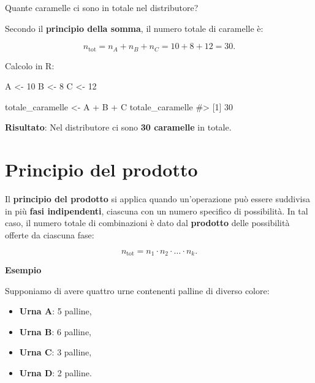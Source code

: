 \documentclass[
  italian,
  letterpaper,
  a4paper,
  11pt,
  open=any]{scrbook}
\newenvironment{Shaded}{\begin{snugshade}}{\end{snugshade}}
\newcommand{\CommentTok}[1]{\textcolor[rgb]{0.37,0.37,0.37}{#1}}
\newcommand{\DecValTok}[1]{\textcolor[rgb]{0.68,0.00,0.00}{#1}}
\newcommand{\NormalTok}[1]{\textcolor[rgb]{0.00,0.23,0.31}{#1}}
\newcommand{\OtherTok}[1]{\textcolor[rgb]{0.00,0.23,0.31}{#1}}
\newcommand{\SpecialCharTok}[1]{\textcolor[rgb]{0.37,0.37,0.37}{#1}}
\providecommand{\tightlist}{%
  \setlength{\itemsep}{0pt}\setlength{\parskip}{0pt}}
\theoremstyle{plain}
\theoremstyle{definition}
\theoremstyle{definition}
\theoremstyle{remark}
\begin{document}
Quante caramelle ci sono in totale nel distributore?

Secondo il \textbf{principio della somma}, il numero totale di caramelle
è:

\[
n_{\text{tot}} = n_A + n_B + n_C = 10 + 8 + 12 = 30.
\]

Calcolo in R:

\begin{Shaded}
\begin{Highlighting}[]
\NormalTok{A }\OtherTok{\textless{}{-}} \DecValTok{10}
\NormalTok{B }\OtherTok{\textless{}{-}} \DecValTok{8}
\NormalTok{C }\OtherTok{\textless{}{-}} \DecValTok{12}

\NormalTok{totale\_caramelle }\OtherTok{\textless{}{-}}\NormalTok{ A }\SpecialCharTok{+}\NormalTok{ B }\SpecialCharTok{+}\NormalTok{ C}
\NormalTok{totale\_caramelle}
\CommentTok{\#\textgreater{} [1] 30}
\end{Highlighting}
\end{Shaded}

\textbf{Risultato}: Nel distributore ci sono \textbf{30 caramelle} in
totale.

\section{Principio del prodotto}\label{principio-del-prodotto-1}

Il \textbf{principio del prodotto} si applica quando un'operazione può
essere suddivisa in più \textbf{fasi indipendenti}, ciascuna con un
numero specifico di possibilità. In tal caso, il numero totale di
combinazioni è dato dal \textbf{prodotto} delle possibilità offerte da
ciascuna fase:

\[
n_{\text{tot}} = n_1 \cdot n_2 \cdot \dots \cdot n_k .
\]

\textbf{Esempio}

Supponiamo di avere quattro urne contenenti palline di diverso colore:

\begin{itemize}
\tightlist
\item
  \textbf{Urna A}: 5 palline,\\
\item
  \textbf{Urna B}: 6 palline,\\
\item
  \textbf{Urna C}: 3 palline,\\
\item
  \textbf{Urna D}: 2 palline.
\end{itemize}
\end{document}
